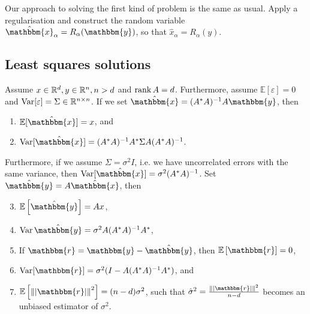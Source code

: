 \documentclass[12pt]{article}
\begin{document}
Our approach to solving the first kind of problem is the same as usual. Apply a regularisation and construct the random variable $\hat{\mathbbm{x}}_\alpha = R_\alpha(\mathbbm{y})$, so that $\hat{x}_\alpha = R_\alpha(y)$. 

\subsection{Least squares solutions}

\begin{theorem}
    Assume $x\in\mathbb{R}^d, y\in\mathbb{R}^n, n> d$ and $\operatorname{rank} A = d$. Furthermore, assume $\mathbb{E}[\varepsilon]=0$ and $\operatorname{Var}[\varepsilon] = \Sigma \in \mathbb{R}^{n\times n}$. If we set $\hat{\mathbbm{x}} = (A^*A)^{-1} A \mathbbm{y}$, then
    \begin{enumerate}[label=(\alph*)]
        \item $\mathbb{E}[\hat{\mathbbm{x}}]=x$, and
        \item $\var[\hat{\mathbbm{x}}]= (A^*A)^{-1}A^*\Sigma A(A^*A)^{-1}$.
    \end{enumerate}
    Furthermore, if we assume $\Sigma = \sigma^2 I$, i.e. we have uncorrelated errors with the same variance, then $\var[\hat{\mathbbm{x}}]= \sigma^2 (A^*A)^{-1}$. Set $\hat{\mathbbm{y}} = A \hat{\mathbbm{x}}$, then 
    \begin{enumerate}[label=(\alph*)]
        \setcounter{enumi}{2}
        \item $\E{\hat{\mathbbm{y}}} = Ax$,
        \item $\var \hat{\mathbbm{y}} = \sigma^2 A(A^*A)^{-1}A^*$,
        \item If $\mathbbm{r} = \mathbbm{y} - \hat{\mathbbm{y}}$, then $\E{\mathbbm{r}} = 0$,
        \item $\var[\mathbbm{r}] = \sigma^2(I - A(A^*A)^{-1}A^*)$, and
        \item $\E{\norm{ \abs{\mathbbm{r}}}^2} = (n-d) \sigma^2$, such that $\hat{\mathbb{\sigma}}^2 = \frac{\norm{ \abs{\mathbbm{r}}}^2}{n-d}$ becomes an unbiased estimator of $\sigma^2$.
    \end{enumerate}
\end{theorem}
\end{document}
